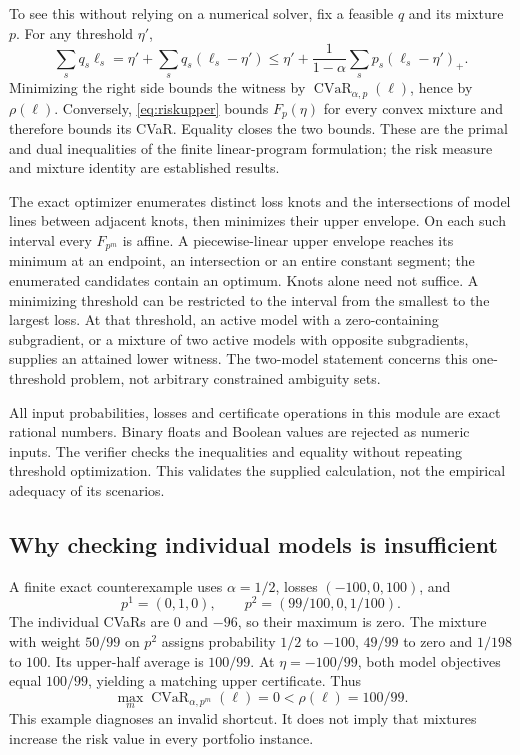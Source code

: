 \documentclass[11pt,a4paper]{article}
\theoremstyle{definition}\newtheorem{definition}[theorem]{Definition}
\begin{document}
To see this without relying on a numerical solver, fix a feasible $q$ and its mixture $p$. For any threshold $\eta'$,
\[
 \sum_s q_s\ell_s
 =\eta'+\sum_s q_s(\ell_s-\eta')
 \le\eta'+\frac{1}{1-\alpha}\sum_s p_s(\ell_s-\eta')_+.
\]
Minimizing the right side bounds the witness by $\operatorname{CVaR}_{\alpha,p}(\ell)$, hence by $\rho(\ell)$. Conversely, \eqref{eq:riskupper} bounds $F_p(\eta)$ for every convex mixture and therefore bounds its CVaR. Equality closes the two bounds. These are the primal and dual inequalities of the finite linear-program formulation; the risk measure and mixture identity are established results.

The exact optimizer enumerates distinct loss knots and the intersections of model lines between adjacent knots, then minimizes their upper envelope. On each such interval every $F_{p^m}$ is affine. A piecewise-linear upper envelope reaches its minimum at an endpoint, an intersection or an entire constant segment; the enumerated candidates contain an optimum. Knots alone need not suffice. A minimizing threshold can be restricted to the interval from the smallest to the largest loss. At that threshold, an active model with a zero-containing subgradient, or a mixture of two active models with opposite subgradients, supplies an attained lower witness. The two-model statement concerns this one-threshold problem, not arbitrary constrained ambiguity sets.

All input probabilities, losses and certificate operations in this module are exact rational numbers. Binary floats and Boolean values are rejected as numeric inputs. The verifier checks the inequalities and equality without repeating threshold optimization. This validates the supplied calculation, not the empirical adequacy of its scenarios.

\subsection{Why checking individual models is insufficient}
A finite exact counterexample uses $\alpha=1/2$, losses $(-100,0,100)$, and
\[
 p^1=(0,1,0),\qquad p^2=(99/100,0,1/100).
\]
The individual CVaRs are $0$ and $-96$, so their maximum is zero. The mixture with weight $50/99$ on $p^2$ assigns probability $1/2$ to $-100$, $49/99$ to zero and $1/198$ to $100$. Its upper-half average is $100/99$. At $\eta=-100/99$, both model objectives equal $100/99$, yielding a matching upper certificate. Thus
\begin{equation}
 \max_m\operatorname{CVaR}_{\alpha,p^m}(\ell)=0
 <\rho(\ell)=100/99.
 \label{eq:mixturecounterexample}
\end{equation}
This example diagnoses an invalid shortcut. It does not imply that mixtures increase the risk value in every portfolio instance.
\end{document}

